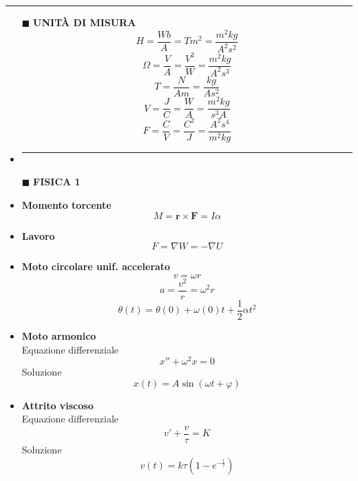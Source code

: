 \documentclass{book}
\newcommand{\g}{\textbf}
\newcommand{\h}{\mathbf}
\newcommand{\e}{\begin{equation}}
\newcommand{\ex}{\end{equation} }
\renewcommand{\it}{\item[$\cdot$]}
\newcommand{\sep}{\item[]\rule{\linewidth}{0.4pt}}
\begin{document}
\newpage
\par\noindent\rule{\linewidth}{0.4pt}\par
\begin{multicols}{4}
\begin{itemize}
\item [$\blacksquare$] \g{UNITÀ DI MISURA}  
    \e{H=\frac{Wb}{A}=Tm^2=\frac{m^2kg}{A^2s^2}} \ex
    \e{\Omega=\frac{V}{A}=\frac{V^2}{W}=\frac{m^2kg}{A^2s^3}} \ex
    \e{T=\frac{N}{Am}=\frac{kg}{As^2}} \ex
    \e{V=\frac{J}{C}=\frac{W}{A}=\frac{m^2kg}{s^3A}}\ex
    \e{F=\frac{C}{V}=\frac{C^2}{J}=\frac{A^2s^4}{m^2kg}}\ex

\sep
\item [$\blacksquare$] \g{FISICA 1}
    \it \g{Momento torcente}
        \e{M=\h{r}\times\h{F}=I\alpha}\ex
    \it \g{Lavoro}
        \e{F=\nabla W=-\nabla U}\ex
    \it \g{Moto circolare unif. accelerato}
        \e{v=\omega r}\ex
        \e{a=\frac{v^2}{r}=\omega^2r}\ex
        \e{\theta(t)=\theta(0)+\omega(0)t+\frac{1}{2}\alpha t^2}\ex
    \it \g{Moto armonico}\\
        Equazione differenziale
        \e{x''+\omega^2x=0}\ex
        Soluzione
        \e{x(t)=A\sin(\omega t+\varphi)} \ex
        \it \g{Attrito viscoso} \\
        Equazione differenziale
        \e{v'+\frac{v}{\tau}=K}\ex
        Soluzione
        \e{v(t)=k\tau(1-e^{-\frac{t}{\tau}})}\ex


\end{itemize}
\end{multicols}
\end{document}
